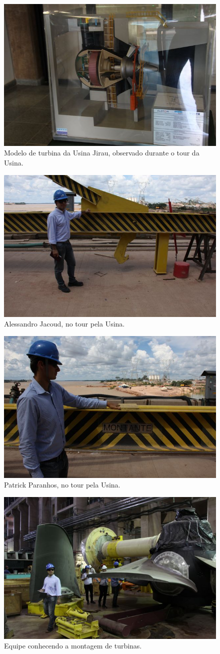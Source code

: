  \begin{figure}[ht!]
    \centering \includegraphics[width=0.6\columnwidth]{figs/jirau/jirau_02}
    \caption{Modelo de turbina da Usina Jirau, observado durante o tour da Usina.}
    \label{fig:jirau2}
\end{figure}

\begin{figure}[ht!]
    \centering \includegraphics[width=0.6\columnwidth]{figs/jirau/jirau_03}
    \caption{Alessandro Jacoud, no tour pela Usina.}
    \label{fig:jirau3}
\end{figure}

\begin{figure}[ht!]
    \centering \includegraphics[width=0.6\columnwidth]{figs/jirau/jirau_04}
    \caption{Patrick Paranhos, no tour pela Usina.}
    \label{fig:jirau4}
\end{figure}

\begin{figure}[ht!]
    \centering \includegraphics[width=0.6\columnwidth]{figs/jirau/jirau_06}
    \caption{Equipe conhecendo a montagem de turbinas.}
    \label{fig:jirau6}
\end{figure}

